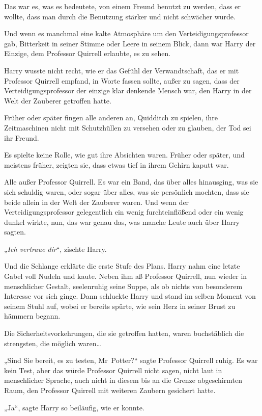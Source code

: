 {Das war es, was es bedeutete, von einem Freund benutzt zu werden, dass er wollte, dass man durch die Benutzung stärker und nicht schwächer wurde.

Und wenn es manchmal eine kalte Atmosphäre um den Verteidigungsprofessor gab, Bitterkeit in seiner Stimme oder Leere in seinem Blick, dann war Harry der Einzige, dem Professor Quirrell erlaubte, es zu sehen.

Harry wusste nicht recht, wie er das Gefühl der Verwandtschaft, das er mit Professor Quirrell empfand, in Worte fassen sollte, außer zu sagen, dass der Verteidigungsprofessor der einzige klar denkende Mensch war, den Harry in der Welt der Zauberer getroffen hatte.

Früher oder später fingen alle anderen an, Quidditch zu spielen, ihre Zeitmaschinen nicht mit Schutzhüllen zu versehen oder zu glauben, der Tod sei ihr Freund.

Es spielte keine Rolle, wie gut ihre Absichten waren. Früher oder später, und meistens früher, zeigten sie, dass etwas tief in ihrem Gehirn kaputt war.

Alle außer Professor Quirrell. Es war ein Band, das über alles hinausging, was sie sich schuldig waren, oder sogar über alles, was sie persönlich mochten, dass sie beide allein in der Welt der Zauberer waren. Und wenn der Verteidigungsprofessor gelegentlich ein wenig furchteinflößend oder ein wenig dunkel wirkte, nun, das war genau das, was manche Leute auch über Harry sagten.

„\emph{Ich vertraue dir}“, zischte Harry.

Und die Schlange erklärte die erste Stufe des Plans. Harry nahm eine letzte Gabel voll Nudeln und kaute. Neben ihm aß Professor Quirrell, nun wieder in menschlicher Gestalt, seelenruhig seine Suppe, als ob nichts von besonderem Interesse vor sich ginge. Dann schluckte Harry und stand im selben Moment von seinem Stuhl auf, wobei er bereits spürte, wie sein Herz in seiner Brust zu hämmern begann.

Die Sicherheitsvorkehrungen, die sie getroffen hatten, waren buchstäblich die strengsten, die möglich waren…

„Sind Sie bereit, es zu testen, Mr~Potter?“ sagte Professor Quirrell ruhig. Es war kein Test, aber das würde Professor Quirrell nicht sagen, nicht laut in menschlicher Sprache, auch nicht in diesem bis an die Grenze abgeschirmten Raum, den Professor Quirrell mit weiteren Zaubern gesichert hatte.

„Ja“, sagte Harry so beiläufig, wie er konnte.

}
